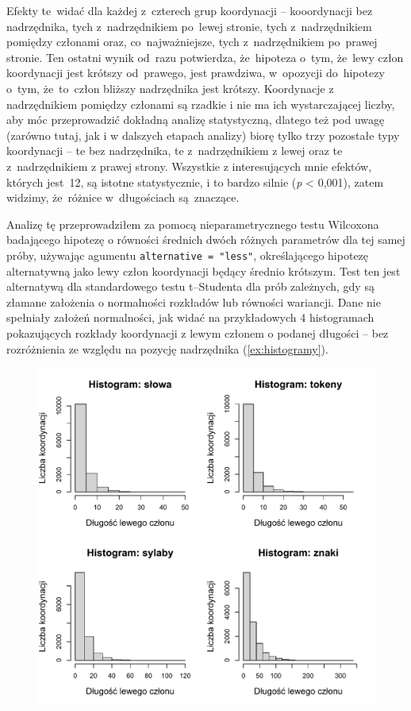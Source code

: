 \documentclass[licencjacka]{pracamgr_Kogni}
\begin{document}
Efekty te~widać dla każdej z~czterech grup koordynacji -- kooordynacji bez nadrzędnika, tych z~nadrzędnikiem po~lewej stronie, tych z~nadrzędnikiem pomiędzy członami oraz, co~najważniejsze, tych z~nadrzędnikiem po~prawej stronie.
Ten ostatni wynik od~razu potwierdza, że~hipoteza o~tym, że~lewy człon koordynacji jest krótszy od~prawego, jest prawdziwa, w~opozycji do~hipotezy o~tym, że~to~człon bliższy nadrzędnika jest krótszy.
Koordynacje z nadrzędnikiem pomiędzy członami są rzadkie i nie ma ich wystarczającej liczby, aby móc przeprowadzić dokładną analizę statystyczną, dlatego też pod uwagę (zarówno tutaj, jak i w dalszych etapach analizy) biorę tylko trzy pozostałe typy koordynacji -- te bez nadrzędnika, te z~nadrzędnikiem z lewej oraz te z~nadrzędnikiem z prawej strony.
Wszystkie z interesujących mnie efektów, których jest~12, są istotne statystycznie, i to bardzo silnie (\textit{p} < 0,001), zatem widzimy, że~różnice w~długościach są~znaczące.

Analizę tę przeprowadziłem za pomocą nieparametrycznego testu Wilcoxona badającego hipotezę o równości średnich dwóch różnych parametrów dla tej samej próby, używając agumentu \texttt{alternative = "less"}, określającego hipotezę alternatywną jako lewy człon koordynacji będący średnio krótszym. Test ten jest alternatywą dla standardowego testu t--Studenta dla prób zależnych, gdy są złamane założenia o normalności rozkładów lub równości wariancji. Dane nie spełniały założeń normalności, jak widać na przykładowych 4 histogramach pokazujących rozkłady koordynacji z lewym członem o podanej długości -- bez rozróżnienia ze względu na pozycję nadrzędnika (\ref{ex:histogramy}).
\begin{exe}
    \ex\label{ex:histogramy}
\end{exe}
    \begin{figure}[H]
    \includegraphics[scale = 0.75]{../analizy/histogramy.pdf}
\end{figure}
\end{document}

